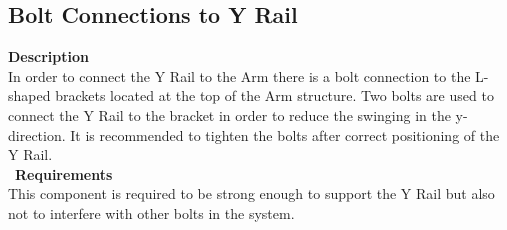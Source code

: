 \documentclass[titlepage]{article}
\begin{document}
\begin{center}
\begin{center}
\begin{center}
\begin{center}
\begin{center}
\begin{center}
\begin{center}
\subsection{Bolt Connections to Y Rail}
\textbf{Description}\\
In order to connect the Y Rail to the Arm there is a bolt connection to the L-shaped brackets located at the top of the Arm structure. Two bolts are used to connect the Y Rail to the bracket in order to reduce the swinging in the y-direction. It is recommended to tighten the bolts after correct positioning of the Y Rail.\\\
\textbf{Requirements}\\
This component is required to be strong enough to support the Y Rail but also not to interfere with other bolts in the system.
\begin{center}



\newpage

\end{center}
\end{center}
\end{center}
\end{center}
\end{center}
\end{center}
\end{center}
\end{center}
\end{document}
